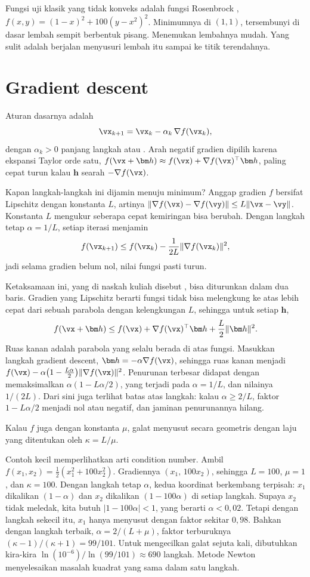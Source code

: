Fungsi uji klasik yang tidak konveks adalah fungsi Rosenbrock \citep{rosenbrock1960},
$f(x,y)=(1-x)^2+100(y-x^2)^2$. Minimumnya di $(1,1)$, tersembunyi di dasar lembah sempit
berbentuk pisang. Menemukan lembahnya mudah. Yang sulit adalah berjalan menyusuri lembah itu
sampai ke titik terendahnya.

\section{Gradient descent}

Aturan dasarnya adalah
\begin{equation}
\vx_{k+1}=\vx_k-\alpha_k\,\nabla f(\vx_k),
\end{equation}
dengan $\alpha_k>0$ panjang langkah atau . Arah negatif gradien dipilih
karena ekspansi Taylor orde satu, $f(\vx+\bm h)\approx f(\vx)+\nabla f(\vx)^\top\bm h$, paling
cepat turun kalau $\bm h$ searah $-\nabla f(\vx)$.

Kapan langkah-langkah ini dijamin menuju minimum? Anggap gradien $f$ bersifat Lipschitz dengan
konstanta $L$, artinya $\|\nabla f(\vx)-\nabla f(\vy)\|\le L\|\vx-\vy\|$. Konstanta $L$ mengukur
seberapa cepat kemiringan bisa berubah. Dengan langkah tetap $\alpha=1/L$, setiap iterasi
menjamin
\[
f(\vx_{k+1})\le f(\vx_k)-\frac{1}{2L}\|\nabla f(\vx_k)\|^2,
\]
jadi selama gradien belum nol, nilai fungsi pasti turun.

Ketaksamaan ini, yang di naskah kuliah disebut , bisa diturunkan dalam dua baris.
Gradien yang Lipschitz berarti fungsi tidak bisa melengkung ke atas lebih cepat dari sebuah parabola
dengan kelengkungan $L$, sehingga untuk setiap $\bm h$,
\[
f(\vx+\bm h)\le f(\vx)+\nabla f(\vx)^\top\bm h+\frac L2\|\bm h\|^2.
\]
Ruas kanan adalah parabola yang selalu berada di atas fungsi. Masukkan langkah gradient descent,
$\bm h=-\alpha\nabla f(\vx)$, sehingga ruas kanan menjadi
$f(\vx)-\alpha\big(1-\tfrac{L\alpha}2\big)\|\nabla f(\vx)\|^2$. Penurunan terbesar didapat dengan
memaksimalkan $\alpha(1-L\alpha/2)$, yang terjadi pada $\alpha=1/L$, dan nilainya $1/(2L)$. Dari sini juga
terlihat batas atas langkah: kalau $\alpha\ge2/L$, faktor $1-L\alpha/2$ menjadi nol atau negatif, dan
jaminan penurunannya hilang.

Kalau $f$ juga 
dengan konstanta $\mu$, galat menyusut secara geometris dengan laju yang ditentukan oleh
 $\kappa=L/\mu$.

Contoh kecil memperlihatkan arti condition number. Ambil $f(x_1,x_2)=\tfrac12(x_1^2+100x_2^2)$.
Gradiennya $(x_1,\,100x_2)$, sehingga $L=100$, $\mu=1$, dan $\kappa=100$. Dengan langkah tetap
$\alpha$, kedua koordinat berkembang terpisah: $x_1$ dikalikan $(1-\alpha)$ dan $x_2$ dikalikan
$(1-100\alpha)$ di setiap langkah. Supaya $x_2$ tidak meledak, kita butuh $|1-100\alpha|<1$, yang
berarti $\alpha<0{,}02$. Tetapi dengan langkah sekecil itu, $x_1$ hanya menyusut dengan faktor
sekitar $0{,}98$. Bahkan dengan langkah terbaik, $\alpha=2/(L+\mu)$, faktor terburuknya
$(\kappa-1)/(\kappa+1)=99/101$. Untuk mengecilkan galat sejuta kali, dibutuhkan kira-kira
$\ln(10^{-6})/\ln(99/101)\approx690$ langkah. Metode Newton menyelesaikan masalah kuadrat yang
sama dalam satu langkah.

